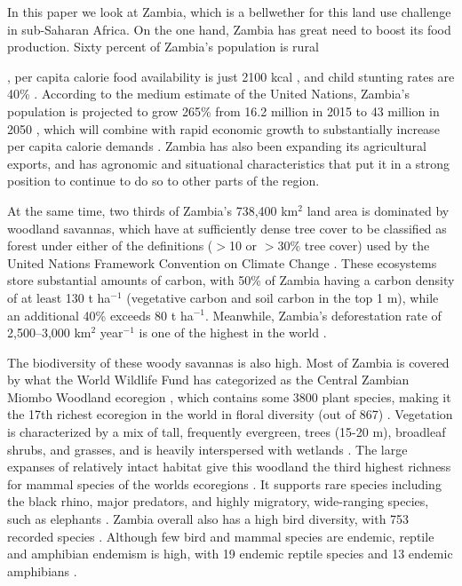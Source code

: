 \documentclass[a4paper]{article}
\begin{document}
In this paper we look at Zambia, which is a bellwether for this land use challenge in sub-Saharan Africa. On the one hand, Zambia has great need to boost its food production. Sixty percent of Zambia's population is rural {\citep{the_world_bank_world_2016}, per capita calorie food availability is just 2100 kcal \citep{fao_faostat_2016}, and child stunting rates are 40\% \citep{haddad_global_2015}.  According to the medium estimate of the United Nations, Zambia's population is projected to grow 265\% from 16.2 million in 2015 to 43 million in 2050 \citep{united_nations_world_2015}, which will combine with rapid economic growth \citep[$>$6\%,][]{the_world_bank_world_2016} to substantially increase per capita calorie demands \citep{tilman_global_2011}. Zambia has also been expanding its agricultural exports, and has agronomic and situational characteristics that put it in a strong position to continue to do so to other parts of the region. 
 
At the same time, two thirds of Zambia's 738,400 km$^2$ land area is dominated by woodland savannas, which have at sufficiently dense tree cover to be classified as forest under either of the definitions ($>$10 or $>$30\% tree cover) used by the United Nations Framework Convention on Climate Change \citep{sexton_conservation_2015}.  These ecosystems store substantial amounts of carbon, with 50\% of Zambia having a carbon density of at least 130 t ha$^{-1}$ (vegetative carbon and soil carbon in the top 1 m), while an additional 40\% exceeds 80 t ha$^{-1}$. Meanwhile, Zambia's deforestation rate of 2,500--3,000 km$^2$ year$^{-1}$ is one of the highest in the world \citep{vinya_preliminary_2011}.
 
The biodiversity of these woody savannas is also high. Most of Zambia is covered by what the World Wildlife Fund has categorized as the Central Zambian Miombo Woodland ecoregion \citep{olson_terrestrial_2001,hogan_central_2004}, which contains some 3800 plant species, making it the 17th richest ecoregion in the world in floral diversity (out of 867) \citep{kier_global_2005}. Vegetation is characterized by a mix of tall, frequently evergreen, trees (15-20 m), broadleaf shrubs, and grasses, and is heavily interspersed with wetlands \citep{hogan_central_2004}.  The large expanses of relatively intact habitat give this woodland the third highest richness for mammal species of the worlds ecoregions  \citep{olson_terrestrial_2001,fund_ecoregions_2011, estes_zambezian_????}.  It supports rare species including the  black rhino,  major predators, and highly migratory, wide-ranging species, such as elephants \citep{hogan_central_2004}.  Zambia overall also has a high bird diversity, with 753 recorded species \citep{dowsett_birds_2008}. Although few bird and mammal species are endemic, reptile and amphibian endemism is high, with 19 endemic reptile species and 13 endemic amphibians \citep{fund_ecoregions_2011}.  
 
}
\end{document}
